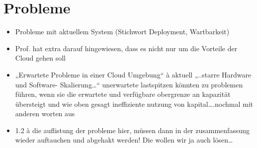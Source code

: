 

\section{Probleme}
\begin{itemize}
  \item Probleme mit aktuellem System (Stichwort Deployment, Wartbarkeit)
  \item Prof. hat extra darauf hingewiesen, dass es nicht nur um die Vorteile der Cloud gehen soll
  \item „Erwartete Probleme in einer Cloud Umgebung“ à aktuell „..starre Hardware und Software- Skalierung…“ unerwartete lastspitzen könnten zu problemen führen, wenn sie die erwartete und verfügbare obergrenze an kapazität übersteigt und wie oben gesagt ineffiziente nutzung von kapital….nochmal mit anderen worten aus 
  \item  1.2 à die auflistung der probleme hier, müssen dann in der zusammenfassung wieder auftauchen und abgehakt werden! Die wollen wir ja auch lösen…
\end{itemize}
